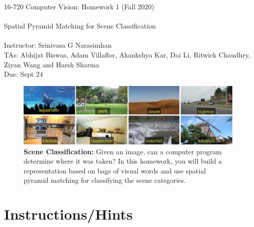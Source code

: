 \documentclass[10pt]{article}
\begin{document}
\begin{center}
    {\LARGE 16-720 Computer Vision: Homework 1 (Fall 2020)} \\
    ~ \\
    {\LARGE Spatial Pyramid Matching for Scene Classification} \\
    ~ \\ 
  Instructor: Srinivasa G Narasimhan\\
  TAs: Abhijat Biswas, Adam Villaflor, Akankshya Kar, Dai Li, Ritwick Chaudhry, Ziyan Wang and Harsh Sharma\\
    { Due: Sept 24 } \\
\end{center}

\begin{figure}[h]
\centering
\includegraphics[width=\textwidth]{figures/teaser/teaser.png}
\caption{{\bf Scene Classification:} Given an image, can a computer program determine where it was taken? In this homework, you will build a representation based on bags of visual words and use spatial pyramid matching for classifying the scene categories.}
\label{fig:teaser}
\end{figure}

\section*{Instructions/Hints}
\end{document}
